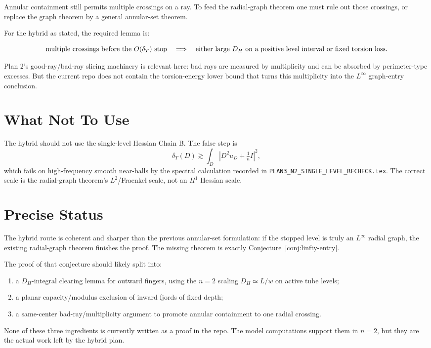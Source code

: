 \documentclass[11pt]{article}
\newcommand{\dT}{\delta_T}
\begin{document}
Annular containment still permits multiple crossings on a ray.  To feed the
radial-graph theorem one must rule out those crossings, or replace the graph
theorem by a general annular-set theorem.

For the hybrid as stated, the required lemma is:

\[
   \hbox{multiple crossings before the \(O(\dT)\) stop}
      \quad\Longrightarrow\quad
   \hbox{either large }D_H\hbox{ on a positive level interval}
   \hbox{ or fixed torsion loss}.
\]

Plan 2's good-ray/bad-ray slicing machinery is relevant here: bad rays are
measured by multiplicity and can be absorbed by perimeter-type excesses.  But
the current repo does not contain the torsion-energy lower bound that turns
this multiplicity into the \(L^\infty\) graph-entry conclusion.

\section{What Not To Use}

The hybrid should not use the single-level Hessian Chain B.  The false step is
\[
   \dT(D)\gtrsim \int_D |D^2u_D+\tfrac1nI|^2,
\]
which fails on high-frequency smooth near-balls by the spectral calculation
recorded in \texttt{PLAN3\_N2\_SINGLE\_LEVEL\_RECHECK.tex}.  The correct
scale is the radial-graph theorem's \(L^2\)/Fraenkel scale, not an \(H^1\)
Hessian scale.

\section{Precise Status}

The hybrid route is coherent and sharper than the previous annular-set
formulation: if the stopped level is truly an \(L^\infty\) radial graph, the
existing radial-graph theorem finishes the proof.  The missing theorem is
exactly Conjecture~\ref{conj:linfty-entry}.

The proof of that conjecture should likely split into:
\begin{enumerate}
\item a \(D_H\)-integral clearing lemma for outward fingers, using the
\(n=2\) scaling \(D_H\simeq L/w\) on active tube levels;
\item a planar capacity/modulus exclusion of inward fjords of fixed depth;
\item a same-center bad-ray/multiplicity argument to promote annular
containment to one radial crossing.
\end{enumerate}

None of these three ingredients is currently written as a proof in the repo.
The model computations support them in \(n=2\), but they are the actual work
left by the hybrid plan.
\end{document}
